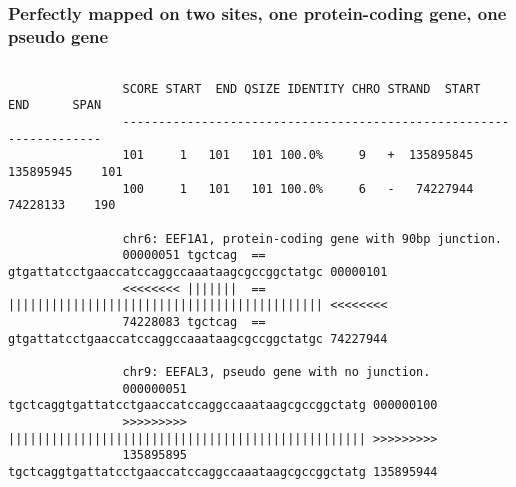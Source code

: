 \begin{frame}[c,fragile]
	\frametitle{ Perfectly mapped on two sites, one protein-coding gene, one pseudo gene }
	\begin{examples}

		\begin{lstlisting}[basicstyle=\tiny]
			
				SCORE START  END QSIZE IDENTITY CHRO STRAND  START    END      SPAN
				-------------------------------------------------------------------
				101     1   101   101 100.0%     9   +  135895845 135895945    101
				100     1   101   101 100.0%     6   -   74227944  74228133    190
				
				chr6: EEF1A1, protein-coding gene with 90bp junction.
				00000051 tgctcag  == gtgattatcctgaaccatccaggccaaataagcgccggctatgc 00000101
				<<<<<<<< |||||||  == |||||||||||||||||||||||||||||||||||||||||||| <<<<<<<<
				74228083 tgctcag  == gtgattatcctgaaccatccaggccaaataagcgccggctatgc 74227944
				
				chr9: EEFAL3, pseudo gene with no junction.
				000000051 tgctcaggtgattatcctgaaccatccaggccaaataagcgccggctatg 000000100
				>>>>>>>>> |||||||||||||||||||||||||||||||||||||||||||||||||| >>>>>>>>>
				135895895 tgctcaggtgattatcctgaaccatccaggccaaataagcgccggctatg 135895944

		\end{lstlisting}
		\end{examples}
	
\end{frame}



